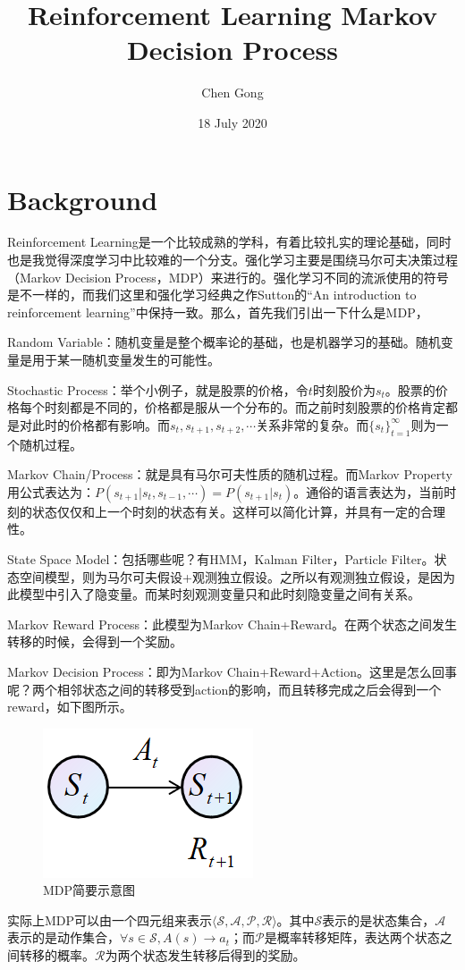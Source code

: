 \documentclass[a4paper]{article}
\title{Reinforcement Learning Markov Decision Process}
\author{Chen Gong}
\date{18 July 2020}
\begin{document}

\maketitle
\tableofcontents
\newpage
\setcounter{page}{1} %
\section{Background}
Reinforcement Learning是一个比较成熟的学科，有着比较扎实的理论基础，同时也是我觉得深度学习中比较难的一个分支。强化学习主要是围绕马尔可夫决策过程（Markov Decision Process，MDP）来进行的。强化学习不同的流派使用的符号是不一样的，而我们这里和强化学习经典之作Sutton的“An introduction to reinforcement learning”中保持一致。那么，首先我们引出一下什么是MDP，

Random Variable：随机变量是整个概率论的基础，也是机器学习的基础。随机变量是用于某一随机变量发生的可能性。

Stochastic Process：举个小例子，就是股票的价格，令$t$时刻股价为$s_t$。股票的价格每个时刻都是不同的，价格都是服从一个分布的。而之前时刻股票的价格肯定都是对此时的价格都有影响。而$s_t,s_{t+1},s_{t+2},\cdots$关系非常的复杂。而$\{s_t\}_{t=1}^\infty$则为一个随机过程。

Markov Chain/Process：就是具有马尔可夫性质的随机过程。而Markov Property用公式表达为：$P(s_{t+1}|s_{t},s_{t-1},\cdots) = P(s_{t+1}|s_t)$。通俗的语言表达为，当前时刻的状态仅仅和上一个时刻的状态有关。这样可以简化计算，并具有一定的合理性。

State Space Model：包括哪些呢？有HMM，Kalman Filter，Particle Filter。状态空间模型，则为马尔可夫假设+观测独立假设。之所以有观测独立假设，是因为此模型中引入了隐变量。而某时刻观测变量只和此时刻隐变量之间有关系。

Markov Reward Process：此模型为Markov Chain+Reward。在两个状态之间发生转移的时候，会得到一个奖励。

Markov Decision Process：即为Markov Chain+Reward+Action。这里是怎么回事呢？两个相邻状态之间的转移受到action的影响，而且转移完成之后会得到一个reward，如下图所示。
\begin{figure}[H]
    \centering
    \includegraphics[width=.15\textwidth]{微信图片_20200719002902.png}
    \caption{MDP简要示意图}
    \label{fig:my_label_1}
\end{figure}
实际上MDP可以由一个四元组来表示$\langle \mathcal{S},\mathcal{A},\mathcal{P},\mathcal{R} \rangle$。其中$\mathcal{S}$表示的是状态集合，$\mathcal{A}$表示的是动作集合，$\forall s\in \mathcal{S}, A(s)\to a_t$；而$\mathcal{P}$是概率转移矩阵，表达两个状态之间转移的概率。$\mathcal{R}$为两个状态发生转移后得到的奖励。
\end{document}
